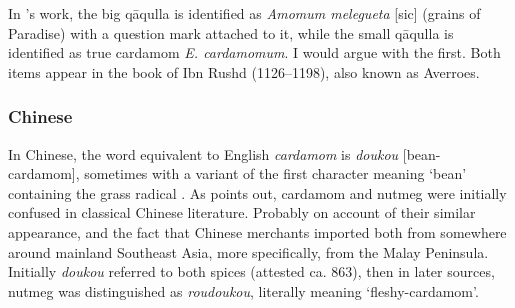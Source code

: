 In \textcite[66-68]{amar_arabian_2017}'s work, the big q\={a}qulla is identified as \textit{Amomum melegueta} [sic] (grains of Paradise) with a question mark attached to it, while the small q\={a}qulla is identified as true cardamom \textit{E. cardamomum}. I would argue with the first. Both items appear in the book of Ibn Rushd (1126--1198), also known as Averroes.




\subsubsection{Chinese}



In Chinese, the word equivalent to English \textit{cardamom} is  \textit{doukou} [bean-cardamom], sometimes with a variant of the first character meaning `bean' containing the grass radical . As \textcite[22]{donkin_between_2003} points out, cardamom and nutmeg were initially confused in classical Chinese literature. Probably on account of their similar appearance, and the fact that Chinese merchants imported both from somewhere around mainland Southeast Asia, more specifically, from the Malay Peninsula. Initially \textit{doukou} referred to both spices (attested ca. 863), then in later sources, nutmeg was distinguished as  \textit{roudoukou}, literally meaning `fleshy-cardamom'. 


